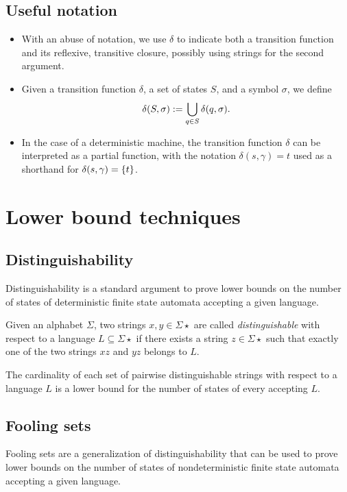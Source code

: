 \subsection{Useful notation}
\begin{itemize}
	\item With an abuse of notation, we use $\delta$ to indicate both a transition function and its reflexive, transitive closure, possibly using strings for the second argument.
	\item Given a transition function $\delta$, a set of states $S$, and a symbol $\sigma$, we define
	      \begin{equation*}
		      \delta(S,\sigma):=\bigcup_{q\in S} \delta(q,\sigma) \text.
	      \end{equation*}
	\item In the case of a deterministic machine, the transition function $\delta$ can be interpreted as a partial function, with the notation $\delta(s,\gamma)=t$ used as a shorthand for $\delta(s,\gamma)=\{t\}$.
\end{itemize}



\section{Lower bound techniques}


\subsection{Distinguishability}\label{sub:distinguishability}
Distinguishability is a standard argument to prove lower bounds on the number of states of deterministic finite state automata accepting a given language.
\begin{defn}
	Given an alphabet $\Sigma$, two strings $x,y\in\Sigma\star$ are called \emph{distinguishable} with respect to a language $L\subseteq\Sigma\star$ if there exists a string $z\in\Sigma\star$ such that exactly one of the two strings $xz$ and $yz$ belongs to $L$.
\end{defn}
\begin{thrm}
	The cardinality of each set of pairwise distinguishable strings with respect to a language $L$ is a lower bound for the number of states of every \ODFA accepting $L$.
\end{thrm}


\subsection{Fooling sets}\label{sub:foolingsets}
Fooling sets are a generalization of distinguishability that can be used to prove lower bounds on the number of states of nondeterministic finite state automata accepting a given language.

